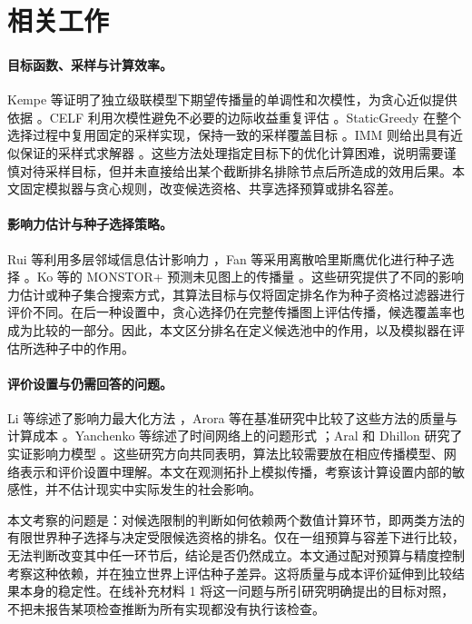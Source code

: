 \documentclass[smallextended]{svjour3}
\begin{document}
\section{相关工作}
\paragraph{目标函数、采样与计算效率。}Kempe 等证明了独立级联模型下期望传播量的单调性和次模性，为贪心近似提供依据 \cite{ref1}。CELF 利用次模性避免不必要的边际收益重复评估 \cite{ref7}。StaticGreedy 在整个选择过程中复用固定的采样实现，保持一致的采样覆盖目标 \cite{ref8}。IMM 则给出具有近似保证的采样式求解器 \cite{ref2}。这些方法处理指定目标下的优化计算困难，说明需要谨慎对待采样目标，但并未直接给出某个截断排名排除节点后所造成的效用后果。本文固定模拟器与贪心规则，改变候选资格、共享选择预算或排名容差。

\paragraph{影响力估计与种子选择策略。}Rui 等利用多层邻域信息估计影响力 \cite{ref12}，Fan 等采用离散哈里斯鹰优化进行种子选择 \cite{ref13}。Ko 等的 MONSTOR+ 预测未见图上的传播量 \cite{ref19}。这些研究提供了不同的影响力估计或种子集合搜索方式，其算法目标与仅将固定排名作为种子资格过滤器进行评价不同。在后一种设置中，贪心选择仍在完整传播图上评估传播，候选覆盖率也成为比较的一部分。因此，本文区分排名在定义候选池中的作用，以及模拟器在评估所选种子中的作用。

\paragraph{评价设置与仍需回答的问题。}Li 等综述了影响力最大化方法 \cite{ref9}，Arora 等在基准研究中比较了这些方法的质量与计算成本 \cite{ref16}。Yanchenko 等综述了时间网络上的问题形式 \cite{ref11}；Aral 和 Dhillon 研究了实证影响力模型 \cite{ref15}。这些研究方向共同表明，算法比较需要放在相应传播模型、网络表示和评价设置中理解。本文在观测拓扑上模拟传播，考察该计算设置内部的敏感性，并不估计现实中实际发生的社会影响。

本文考察的问题是：对候选限制的判断如何依赖两个数值计算环节，即两类方法的有限世界种子选择与决定受限候选资格的排名。仅在一组预算与容差下进行比较，无法判断改变其中任一环节后，结论是否仍然成立。本文通过配对预算与精度控制考察这种依赖，并在独立世界上评估种子差异。这将质量与成本评价延伸到比较结果本身的稳定性。在线补充材料 1 将这一问题与所引研究明确提出的目标对照，不把未报告某项检查推断为所有实现都没有执行该检查。
\end{document}
